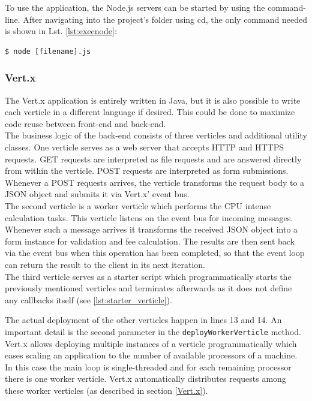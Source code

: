 To use the application, the Node.js servers can be started by using the command-line. After navigating
into the project’s folder using cd, the only command needed is shown in Lst. \ref{lst:execnode}:
\begin{lstlisting}[caption={Executing Node.js code},label=lst:execnode]
$ node [filename].js
\end{lstlisting}%


\subsubsection{Vert.x}
\label{implementation_vertx}

The Vert.x application is entirely written in Java, but it is also possible to
write each verticle in a different language if desired. This could be done to
maximize code reuse between front-end and back-end.\\
The business logic of the back-end consists of three verticles and additional
utility classes.
One verticle serves as a web server that accepts HTTP and HTTPS requests. GET
requests are interpreted as file requests and are answered directly from within
the verticle. POST requests are interpreted as form submissions. Whenever a POST
requests arrives, the verticle transforms the request body to a JSON object and
submits it via Vert.x' event bus.\\
The second verticle is a worker verticle which performs the CPU intense calculation
tasks. This verticle listens on the event bus for incoming messages. Whenever
such a message arrives it transforms the received JSON object into a form
instance for validation and fee calculation. The results are then sent back via
the event bus when this operation has been completed, so that the event loop can return
the result to the client in its next iteration.\\
The third verticle serves as a starter script which programmatically starts
the previously mentioned verticles and terminates afterwards as it does not
define any callbacks itself (see \autoref{lst:starter_verticle}).



The actual deployment of the other verticles happen in lines 13 and 14.
An important detail is the second parameter in the \texttt{deployWorkerVerticle} method.
Vert.x allows deploying multiple instances of a verticle programmatically
which eases scaling an application to the number of available processors of a machine.
In this case the main loop is single-threaded and for each remaining processor
there is one worker verticle. Vert.x automatically distributes requests among
these worker verticles (as described in section \ref{Vert.x}).

